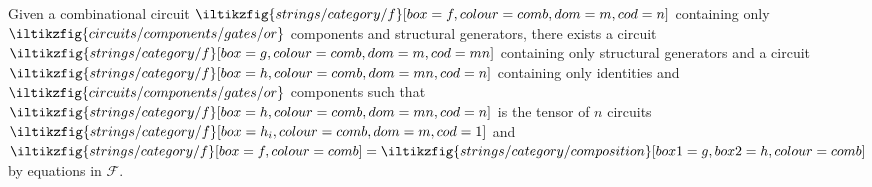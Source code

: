 \begin{lemma}\label{lem:or-normalising}
    Given a combinational circuit \(
    \iltikzfig{strings/category/f}[box=f,colour=comb,dom=m,cod=n]
    \) containing only \(
    \iltikzfig{circuits/components/gates/or}
    \) components and structural generators, there exists a circuit
    \(
    \iltikzfig{strings/category/f}[box=g,colour=comb,dom=m,cod=mn]
    \) containing only structural generators and a circuit
    \(
    \iltikzfig{strings/category/f}[box=h,colour=comb,dom=mn,cod=n]
    \) containing only identities and \(
    \iltikzfig{circuits/components/gates/or}
    \) components such that \(
    \iltikzfig{strings/category/f}[box=h,colour=comb,dom=mn,cod=n]
    \) is the tensor of \(n\) circuits \(
    \iltikzfig{strings/category/f}[box=h_i,colour=comb,dom=m,cod=1]
    \) and \(
    \iltikzfig{strings/category/f}[box=f,colour=comb]
    =
    \iltikzfig{strings/category/composition}[box1=g,box2=h,colour=comb]
    \) by equations in \(\mathcal{F}\).
\end{lemma}
